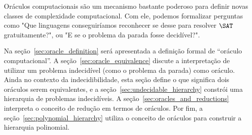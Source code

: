 Oráculos computacionais são um mecanismo bastante poderoso
para definir novas classes de complexidade computacional.
Com ele,
podemos formalizar perguntas como
"Que linguagens conseguiríamos reconhecer
se desse para resolver $\SAT$ gratuitamente?",
ou "E se o problema da parada fosse decidível?".

Na seção~\ref{sec:oracle_definition} será apresentada a definição formal
de ``oráculo computacional''.
A seção~\ref{sec:oracle_equivalence}
discute a interpretação de utilizar um problema indecidível
(como o problema da parada)
como oráculo.
Ainda no contexto da indecidibilidade,
esta seção define o que significa dois oráculos serem equivalentes,
e a seção~\ref{sec:undecidable_hierarchy}
constrói uma hierarquia de problemas indecidíveis.
A seção~\ref{sec:oracles_and_reductions}
interpreta o conceito de redução em termos de oráculos.
Por fim, a seção~\ref{sec:polynomial_hierarchy}
utiliza o conceito de oráculos para construir a hierarquia polinomial.
